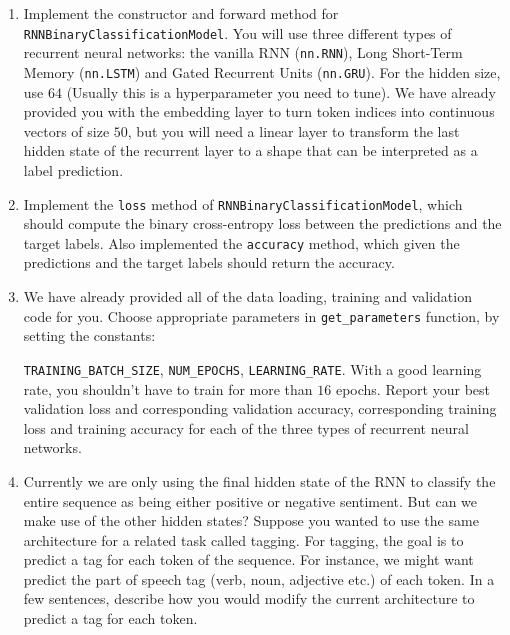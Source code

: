 \documentclass{article}
\begin{document}
\begin{bprob}
\begin{enumerate}
    \item {}
    Implement the constructor and forward method for \texttt{RNNBinaryClassificationModel}. You will use three different types of recurrent neural networks:
    the vanilla RNN (\texttt{nn.RNN}), Long Short-Term Memory (\texttt{nn.LSTM}) and Gated Recurrent Units (\texttt{nn.GRU}). For the hidden size, use
    $64$ (Usually this is a hyperparameter you need to tune). We have already provided you with the embedding layer to turn
    token indices into continuous vectors of size $50$, but you will need a linear
    layer to transform the last hidden state of the recurrent layer to a shape that can be interpreted as a label prediction.
    
    
    \item {}
    Implement the \texttt{loss} method of \texttt{RNNBinaryClassificationModel}, which should compute the binary cross-entropy loss between the predictions and the target labels. Also implemented the \texttt{accuracy} method, which given the predictions and the target labels should return the accuracy.
    
    \item {}
    We have already provided all of the data loading, training and validation code for you. Choose appropriate parameters in \texttt{get\_parameters} function, by setting the constants:
    
    \texttt{TRAINING\_BATCH\_SIZE}, \texttt{NUM\_EPOCHS}, \texttt{LEARNING\_RATE}.
    With a good learning rate, you shouldn't have to train for more than $16$ epochs.
    Report your best validation loss and corresponding validation accuracy, corresponding training loss and training accuracy for each of the three types of recurrent neural networks.
    
    \item {}
    Currently we are only using the final hidden state of the RNN to classify the entire sequence as being either positive or negative
    sentiment. But can we make use of the other hidden states?
    Suppose you wanted to use the same architecture for a related task called tagging. For tagging, the goal is to predict a tag for each token
    of the sequence. For instance, we might want predict the part of speech tag (verb, noun, adjective etc.) of each token. In a few sentences, describe how
    you would modify the current architecture to predict a tag for each token.
    
\end{enumerate}


\end{bprob}
\end{document}
